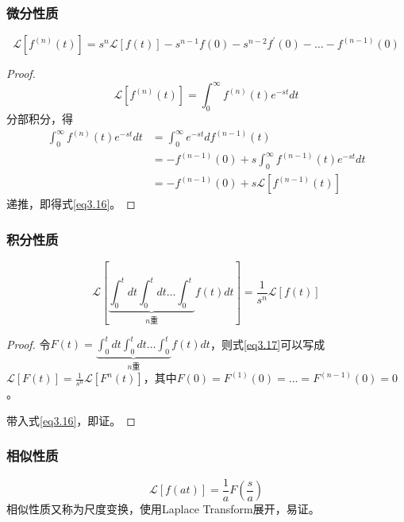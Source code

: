 \documentclass[lang=cn,10pt]{elegantbook}
\newcommand\mc[1]{\mathcal{#1}}
\begin{document}
\subsubsection{微分性质}
\begin{equation}\label{eq3.16}
	\mathcal{L}\left[f^{(n)}\left(t\right)\right]=
	s^{n}\mathcal{L}\left[f\left(t\right)\right]-s^{n-1}f\left(0\right)-s^{n-2}f^{\prime}\left(0\right)-\ldots-f^{(n-1)}\left(0\right)
\end{equation}
\begin{proof}
	\begin{equation*}
		\mathcal{L}\left[f^{(n)}\left(t\right)\right]=\int_{0}^{\infty} f^{(n)}\left(t\right) e^{-st}dt
	\end{equation*}
	分部积分，得
	\begin{equation*}
		\begin{aligned}
			\int_{0}^{\infty} f^{(n)}\left(t\right) e^{-st}dt & = \int_{0}^{\infty} e^{-st}df^{(n-1)}(t)                     \\
			                                                  & =  -f^{(n-1)}(0) + s\int_{0}^{\infty} f^{(n-1)}(t) e^{-st}dt \\
			                                                  & = -f^{(n-1)}(0) + s\mc{L}[f^{(n-1)}(t)]
		\end{aligned}
	\end{equation*}
	递推，即得式\ref{eq3.16}。
\end{proof}

\subsubsection{积分性质}
\begin{equation}\label{eq3.17}
	\mathcal{L}\left[\underbrace{\int_0^tdt\int_0^tdt\ldots\int_0^t}_{n\text{重}} f \left ( t \right ) dt \right ]
	= \frac 1 {s^n}\mathcal{L}\left[f\left(t\right)\right]
\end{equation}
\begin{proof}
	令$F(t) = \underbrace{\int_0^tdt\int_0^tdt\ldots\int_0^t}_{n\text{重}} f \left ( t \right ) dt$，则式\ref{eq3.17}可以写成
	$\mc{L}[F(t)] = \frac1{s^n}\mc{L}[F^{n}(t)]$，其中$F(0)=F^{(1)}(0) = ... = F^{(n-1)}(0) = 0$。

	带入式\ref{eq3.16}，即证。
\end{proof}

\subsubsection{相似性质}
\begin{equation}
	\mathcal{L}[f(at)]=\frac1aF(\frac sa)
\end{equation}
相似性质又称为尺度变换，使用Laplace Transform展开，易证。
\end{document}
